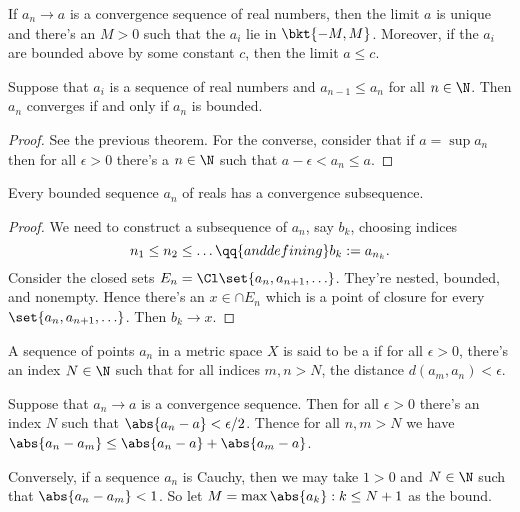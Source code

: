 \begin{thm}
    \label{thm:sequences_and_limits}
    If $a_n \to a$ is a convergence sequence of real numbers, then the limit $a$ is unique and there's an $M > 0$ such that the $a_i$ lie in $\bkt{-M, M}$. Moreover, if the $a_i$ are bounded above by some constant $c$, then the limit $a \le c$.
\end{thm}

\begin{thm}
    \label{thm:monotone_convergence_theorem}
    Suppose that $a_i$ is a sequence of real numbers and $a_{n-1} \le a_n$ for all $n \in \N$. Then $a_n$ converges if and only if $a_n$ is bounded.
\end{thm}

\begin{proof}
See the previous theorem. For the converse, consider that if $a = \sup a_n$ then for all $\epsilon > 0$ there's a $n \in \N$ such that $a - \epsilon < a_n \le a$.
\end{proof}

\begin{thm}
    \label{thm:bolzano_weierstrauss}
    Every bounded sequence $a_n$ of reals has a convergence subsequence.
\end{thm}

\begin{proof}
We need to construct a subsequence of $a_n$, say $b_k$, choosing indices
\begin{equation*}
    n_1 \le n_2 \le \ldots \qq{and defining} b_k := a_{n_k}.
\end{equation*}
    Consider the closed sets $E_n = \Cl \set{a_n, a_{n+1}, \ldots}$. They're nested, bounded, and nonempty. Hence there's an $x \in \cap E_n$ which is a point of closure for every $\set{a_n, a_{n+1}, \ldots}$. Then $b_k \to x$.
\end{proof}

\begin{defn}
    \label{defn:cauchy_sequence}
    A sequence of points $a_n$ in a metric space $X$ is said to be a  if for all $\epsilon > 0$, there's an index $N \in \N$ such that for all indices $m,n > N$, the distance $d(a_m, a_n) < \epsilon$.
\end{defn}

\begin{thm}
    \label{thm:cauchy_criterion_for_r_}
    Suppose that $a_n \to a$ is a convergence sequence. Then for all $\epsilon > 0$ there's an index $N$ such that $\abs{a_n - a} < \epsilon/2$. Thence for all $n,m > N$ we have $\abs{a_n - a_m} \le \abs{a_n - a} + \abs{a_m - a}$.

    Conversely, if a sequence $a_n$ is Cauchy, then we may take $1> 0$ and $N \in \N$ such that $\abs{a_n - a_m} < 1$. So let $M = \max{\abs{a_k} : k \le N} + 1$ as the bound. \TODO
\end{thm}

